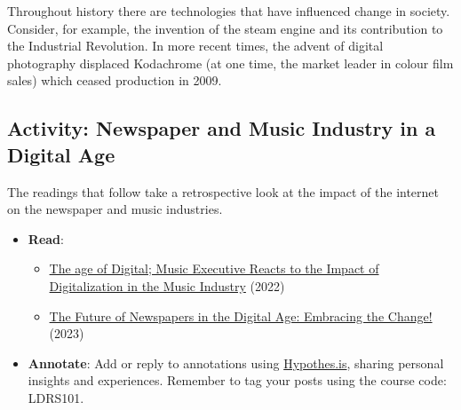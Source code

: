 \documentclass[
  letterpaper,
  DIV=11,
  numbers=noendperiod]{scrreprt}
\providecommand{\tightlist}{%
  \setlength{\itemsep}{0pt}\setlength{\parskip}{0pt}}\usepackage{longtable,booktabs,array}
\begin{document}
Throughout history there are technologies that have influenced change in
society. Consider, for example, the invention of the steam engine and
its contribution to the Industrial Revolution. In more recent times, the
advent of digital photography displaced Kodachrome (at one time, the
market leader in colour film sales) which ceased production in 2009.

\subsection{Activity: Newspaper and Music Industry in a Digital
Age}\label{activity-newspaper-and-music-industry-in-a-digital-age}

\begin{tcolorbox}[enhanced jigsaw, toprule=.15mm, colback=white, colframe=quarto-callout-note-color-frame, bottomtitle=1mm, leftrule=.75mm, coltitle=black, titlerule=0mm, rightrule=.15mm, colbacktitle=quarto-callout-note-color!10!white, left=2mm, title={Learning Activity}, opacitybacktitle=0.6, opacityback=0, breakable, toptitle=1mm, arc=.35mm, bottomrule=.15mm]

The readings that follow take a retrospective look at the impact of the
internet on the newspaper and music industries.

\begin{itemize}
\tightlist
\item
  \textbf{Read}:

  \begin{itemize}
  \tightlist
  \item
    \href{https://www.forbes.com/sites/joshwilson/2022/09/14/the-age-of-digital-music-executive-reacts-to-the-impact-of-digitalization-in-the-music-industry/?sh=1ca7f385537b}{The
    age of Digital; Music Executive Reacts to the Impact of
    Digitalization in the Music Industry} (2022)
  \item
    \href{https://medium.com/@kumarpriyanshu025/the-future-of-newspapers-in-the-digital-age-embracing-the-change-fe835bd8d52f}{The
    Future of Newspapers in the Digital Age: Embracing the Change!}
    (2023)
  \end{itemize}
\item
  \textbf{Annotate}: Add or reply to annotations using
  \href{https://web.hypothes.is/}{Hypothes.is}, sharing personal
  insights and experiences. Remember to tag your posts using the course
  code: LDRS101.
\end{itemize}

\end{tcolorbox}
\end{document}
